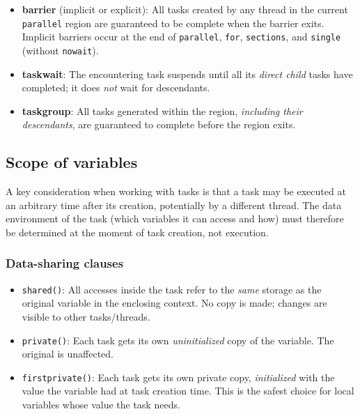 \begin{itemize}
    \item \textbf{barrier} (implicit or explicit): All tasks created by any thread in the current \texttt{parallel} region are guaranteed to be complete when the barrier exits. Implicit barriers occur at the end of \texttt{parallel}, \texttt{for}, \texttt{sections}, and \texttt{single} (without \texttt{nowait}).

    \item \textbf{taskwait}: The encountering task suspends until all its \textit{direct child} tasks have completed; it does \textit{not} wait for descendants.

    \item \textbf{taskgroup}: All tasks generated within the region, \textit{including their descendants}, are guaranteed to complete before the region exits.
\end{itemize}

\subsection{Scope of variables}

A key consideration when working with tasks is that a task may be executed at an arbitrary time after its creation, potentially by a different thread. The data environment of the task (which variables it can access and how) must therefore be determined at the moment of task creation, not execution.

\subsubsection{Data-sharing clauses}

\begin{itemize}
    \item \texttt{shared()}: All accesses inside the task refer to the \textit{same} storage as the original variable in the enclosing context. No copy is made; changes are visible to other tasks/threads.
    
    \item \texttt{private()}: Each task gets its own \textit{uninitialized} copy of the variable. The original is unaffected.
    
    \item \texttt{firstprivate()}: Each task gets its own private copy, \textit{initialized} with the value the variable had at task creation time. This is the safest choice for local variables whose value the task needs.
\end{itemize}

